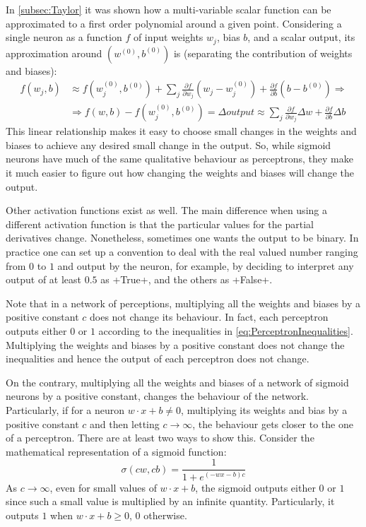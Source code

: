 In \autoref{subsec:Taylor} it was shown how a multi-variable scalar function can be approximated to a first order polynomial around a given point. Considering a single neuron as a function $f$ of input weights $w_j$, bias $b$, and a scalar output, its approximation around $(w^{(0)}, b^{(0)})$ is (separating the contribution of weights and biases):
\begin{equation}
\begin{aligned}
f(w_j, b) &\approx f(w_j^{(0)}, b^{(0)})+ \sum_ j\frac{\partial f}{\partial w_j} \left(w_j-w_j^{(0)}\right) +\frac{\partial f}{\partial b} \left(b-b^{(0)}\right) \Rightarrow\\
&\Rightarrow f(w, b) - f(w_j^{(0)}, b^{(0)} )= \Delta output \approx \sum_ j\frac{\partial f}{\partial w_j} \Delta w +\frac{\partial f}{\partial b} \Delta b
\end{aligned}
\label{eq:NNsmallChanges}
\end{equation}
This linear relationship makes it easy to choose small changes in the weights and biases to achieve any desired small change in the output. So, while sigmoid neurons have much of the same qualitative behaviour as perceptrons, they make it much easier to figure out how changing the weights and biases will change the output.

Other activation functions exist as well. The main difference when using a different activation function is that the particular values for the partial derivatives change. Nonetheless, sometimes one wants the output to be binary. In practice one can set up a convention to deal with the real valued number ranging from $0$ to $1$ and output by the neuron, for example, by deciding to interpret any output of at least $0.5$ as \cd+True+, and the others as \cd+False+.

Note that in a network of perceptions, multiplying all the weights and biases by a positive constant $c$ does not change its behaviour. In fact, each perceptron outputs either $0$ or $1$ according to the inequalities in \autoref{eq:PerceptronInequalities}. Multiplying the weights and biases by a positive constant does not change the inequalities and hence the output of each perceptron does not change.

On the contrary, multiplying all the weights and biases of a network of sigmoid neurons by a positive constant, changes the behaviour of the network. Particularly, if for a neuron $w\cdot x +b \ne 0$, multiplying its weights and bias by a positive constant $c$ and then letting $c\rightarrow \infty$, the behaviour gets closer to the one of a perceptron. There are at least two ways to show this. Consider the mathematical representation of a sigmoid function:
\begin{equation*}
\sigma(cw,cb) = \frac{1}{1+e^{(-wx-b)c}}
\end{equation*}
As $c\rightarrow \infty$, even for small values of $w\cdot x +b$, the sigmoid outputs either $0$ or $1$ since such a small value is multiplied by an infinite quantity. Particularly, it outputs $1$ when $w\cdot x+b\ge 0$, $0$ otherwise. 

